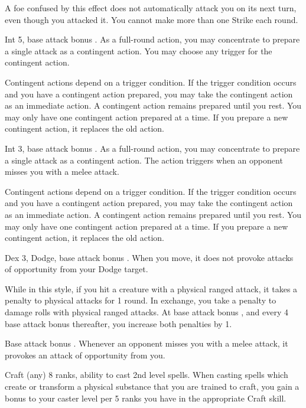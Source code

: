 A foe confused by this effect does not automatically attack you on its next turn, even though you attacked it. You cannot make more than one Strike each round.

\featpre Int 5, base attack bonus .
\featben As a full-round action, you may concentrate to prepare a single attack as a contingent action. You may choose any trigger for the contingent action.

Contingent actions depend on a trigger condition. If the trigger condition occurs and you have a contingent action prepared, you may take the contingent action as an immediate action. A contingent action remains prepared until you rest. You may only have one contingent action prepared at a time. If you prepare a new contingent action, it replaces the old action.

\featpre Int 3, base attack bonus .
\featben As a full-round action, you may concentrate to prepare a single attack as a contingent action. The action triggers when an opponent misses you with a melee attack.

Contingent actions depend on a trigger condition. If the trigger condition occurs and you have a contingent action prepared, you may take the contingent action as an immediate action. A contingent action remains prepared until you rest. You may only have one contingent action prepared at a time. If you prepare a new contingent action, it replaces the old action.

 Dex 3, Dodge, base attack bonus .
 When you move, it does not provoke attacks of opportunity from your Dodge target.

 While in this style, if you hit a creature with a physical ranged attack, it takes a  penalty to physical attacks for 1 round. In exchange, you take a  penalty to damage rolls with physical ranged attacks. At base attack bonus , and every 4 base attack bonus thereafter, you increase both penalties by 1.

\featpre Base attack bonus .
\featben Whenever an opponent misses you with a melee attack, it provokes an attack of opportunity from you.

\featpres Craft (any) 8 ranks, ability to cast 2nd level spells.
\featben When casting spells which create or transform a physical substance that you are trained to craft, you gain a  bonus to your caster level per 5 ranks you have in the appropriate Craft skill.

